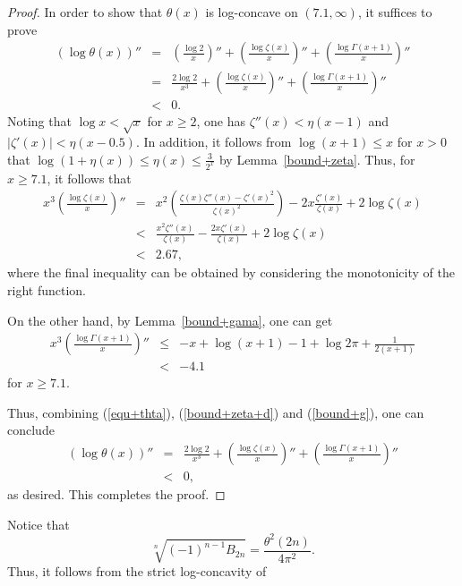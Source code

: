 \documentclass[12pt,reqno]{article}
\theoremstyle{definition}
\numberwithin{equation}{section}
\begin{document}
\begin{proof}
In order to show that $\theta(x)$ is log-concave on $(7.1,\infty)$,
it suffices to prove
\begin{eqnarray}\label{equ+thta}
\left(\log{\theta(x)}\right)''&=&\left(\frac{\log2}{x}\right)''+\left(\frac{\log
\zeta(x)}{x}\right)'' +\left(\frac{\log\Gamma(x+1)}{x}\right)''\nonumber\\
&=&\frac{2\log2}{x^3}+\left(\frac{\log \zeta(x)}{x}\right)''
+\left(\frac{\log\Gamma(x+1)}{x}\right)''\\
&<&0\nonumber.
\end{eqnarray}
Noting that $\log x<\sqrt{x}$ for $x\geq2$, one has
$\zeta''(x)<\eta(x-1)$ and $|\zeta'(x)|<\eta(x-0.5).$ In addition,
it follows from $\log(x+1)\leq x$ for $x>0$ that
$\log(1+\eta(x))\leq\eta(x)\leq\frac{3}{2^x}$ by
Lemma~\ref{bound+zeta}. Thus, for $x\geq7.1$, it follows that
\begin{eqnarray}\label{bound+zeta+d}
x^3\left(\frac{\log
\zeta(x)}{x}\right)''&=&x^2\left(\frac{\zeta(x)\zeta''(x)
-\zeta'(x)^2}{\zeta(x)^2}\right)-2x\frac{\zeta'(x)}{\zeta(x)}+2\log\zeta(x)\nonumber\\
&<&\frac{x^2\zeta''(x)}{\zeta(x)}-\frac{2x\zeta'(x)}{\zeta(x)}+2\log\zeta(x)\nonumber\\
&<&2.67 ,
\end{eqnarray}
where the final inequality can be obtained  by considering the
monotonicity of the right function.

 On the other hand, by
Lemma~\ref{bound+gama}, one can get
\begin{eqnarray}\label{bound+g}
x^3\left(\frac{\log\Gamma(x+1)}{x}\right)''&\leq&-x+\log{(x+1)}-1+\log{2\pi}+\frac{1}{2(x+1)}\nonumber\\
&<&-4.1
\end{eqnarray}
for $x\geq7.1$.


 Thus, combining (\ref{equ+thta}), (\ref{bound+zeta+d}) and
 (\ref{bound+g}), one can conclude
 \begin{eqnarray*}
\left(\log{\theta(x)}\right)''
&=&\frac{2\log2}{x^3}+\left(\frac{\log \zeta(x)}{x}\right)''
+\left(\frac{\log\Gamma(x+1)}{x}\right)''\\
&<&0,
\end{eqnarray*}
as desired. This completes the proof.
\end{proof}
Notice that
$$\sqrt[n]{(-1)^{n-1}B_{2n}}=\frac{\theta^2(2n)}{4\pi^{2}}.$$
Thus, it follows from the strict log-concavity of
\end{document}
